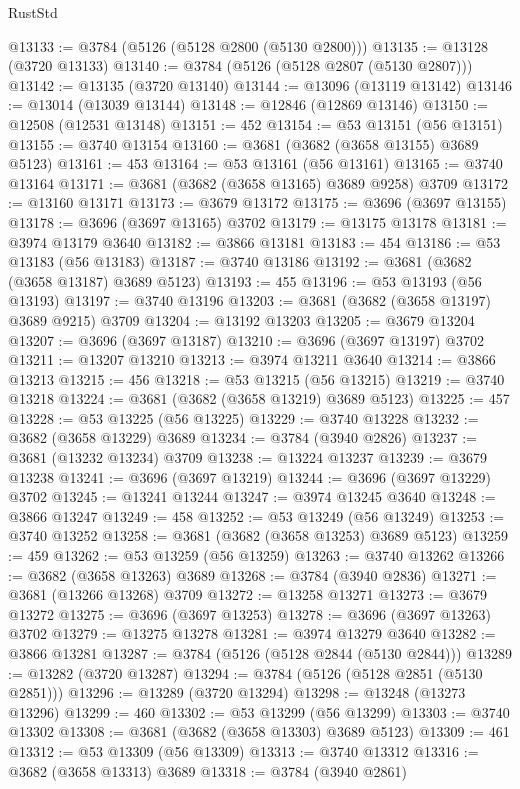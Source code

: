 \begin{lexlean}{RustStd}
\begin{coremodule}
@13133 := @3784 (@5126 (@5128 @2800 (@5130 @2800)))
@13135 := @13128 (@3720 @13133)
@13140 := @3784 (@5126 (@5128 @2807 (@5130 @2807)))
@13142 := @13135 (@3720 @13140)
@13144 := @13096 (@13119 @13142)
@13146 := @13014 (@13039 @13144)
@13148 := @12846 (@12869 @13146)
@13150 := @12508 (@12531 @13148)
@13151 := 452
@13154 := @53 @13151 (@56 @13151)
@13155 := @3740 @13154
@13160 := @3681 (@3682 (@3658 @13155) @3689 @5123)
@13161 := 453
@13164 := @53 @13161 (@56 @13161)
@13165 := @3740 @13164
@13171 := @3681 (@3682 (@3658 @13165) @3689 @9258) @3709
@13172 := @13160 @13171
@13173 := @3679 @13172
@13175 := @3696 (@3697 @13155)
@13178 := @3696 (@3697 @13165) @3702
@13179 := @13175 @13178
@13181 := @3974 @13179 @3640
@13182 := @3866 @13181
@13183 := 454
@13186 := @53 @13183 (@56 @13183)
@13187 := @3740 @13186
@13192 := @3681 (@3682 (@3658 @13187) @3689 @5123)
@13193 := 455
@13196 := @53 @13193 (@56 @13193)
@13197 := @3740 @13196
@13203 := @3681 (@3682 (@3658 @13197) @3689 @9215) @3709
@13204 := @13192 @13203
@13205 := @3679 @13204
@13207 := @3696 (@3697 @13187)
@13210 := @3696 (@3697 @13197) @3702
@13211 := @13207 @13210
@13213 := @3974 @13211 @3640
@13214 := @3866 @13213
@13215 := 456
@13218 := @53 @13215 (@56 @13215)
@13219 := @3740 @13218
@13224 := @3681 (@3682 (@3658 @13219) @3689 @5123)
@13225 := 457
@13228 := @53 @13225 (@56 @13225)
@13229 := @3740 @13228
@13232 := @3682 (@3658 @13229) @3689
@13234 := @3784 (@3940 @2826)
@13237 := @3681 (@13232 @13234) @3709
@13238 := @13224 @13237
@13239 := @3679 @13238
@13241 := @3696 (@3697 @13219)
@13244 := @3696 (@3697 @13229) @3702
@13245 := @13241 @13244
@13247 := @3974 @13245 @3640
@13248 := @3866 @13247
@13249 := 458
@13252 := @53 @13249 (@56 @13249)
@13253 := @3740 @13252
@13258 := @3681 (@3682 (@3658 @13253) @3689 @5123)
@13259 := 459
@13262 := @53 @13259 (@56 @13259)
@13263 := @3740 @13262
@13266 := @3682 (@3658 @13263) @3689
@13268 := @3784 (@3940 @2836)
@13271 := @3681 (@13266 @13268) @3709
@13272 := @13258 @13271
@13273 := @3679 @13272
@13275 := @3696 (@3697 @13253)
@13278 := @3696 (@3697 @13263) @3702
@13279 := @13275 @13278
@13281 := @3974 @13279 @3640
@13282 := @3866 @13281
@13287 := @3784 (@5126 (@5128 @2844 (@5130 @2844)))
@13289 := @13282 (@3720 @13287)
@13294 := @3784 (@5126 (@5128 @2851 (@5130 @2851)))
@13296 := @13289 (@3720 @13294)
@13298 := @13248 (@13273 @13296)
@13299 := 460
@13302 := @53 @13299 (@56 @13299)
@13303 := @3740 @13302
@13308 := @3681 (@3682 (@3658 @13303) @3689 @5123)
@13309 := 461
@13312 := @53 @13309 (@56 @13309)
@13313 := @3740 @13312
@13316 := @3682 (@3658 @13313) @3689
@13318 := @3784 (@3940 @2861)

\end{coremodule}
\end{lexlean}
